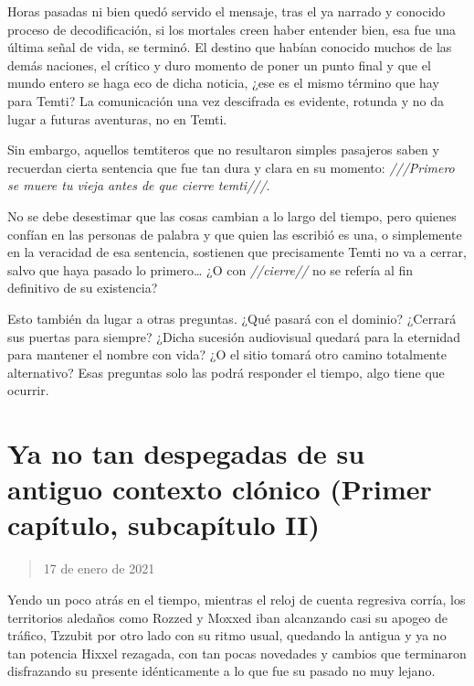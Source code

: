 \documentclass[
  spanish,
]{book}
\begin{document}
Horas pasadas ni bien quedó servido el mensaje, tras el ya narrado y conocido proceso de decodificación, si los mortales creen haber entender bien, esa fue una última señal de vida, se terminó. El destino que habían conocido muchos de las demás naciones, el crítico y duro momento de poner un punto final y que el mundo entero se haga eco de dicha noticia, ¿ese es el mismo término que hay para Temti? La comunicación una vez descifrada es evidente, rotunda y no da lugar a futuras aventuras, no en Temti.

Sin embargo, aquellos temtiteros que no resultaron simples pasajeros saben y recuerdan cierta sentencia que fue tan dura y clara en su momento: \emph{///Primero se muere tu vieja antes de que cierre temti///}.

No se debe desestimar que las cosas cambian a lo largo del tiempo, pero quienes confían en las personas de palabra y que quien las escribió es una, o simplemente en la veracidad de esa sentencia, sostienen que precisamente Temti no va a cerrar, salvo que haya pasado lo primero\ldots{} ¿O con \emph{//cierre//} no se refería al fin definitivo de su existencia?

Esto también da lugar a otras preguntas. ¿Qué pasará con el dominio? ¿Cerrará sus puertas para siempre? ¿Dicha sucesión audiovisual quedará para la eternidad para mantener el nombre con vida? ¿O el sitio tomará otro camino totalmente alternativo?
Esas preguntas solo las podrá responder el tiempo, algo tiene que ocurrir.

\hypertarget{ya-no-tan-despegadas-de-su-antiguo-contexto-cluxf3nico-primer-capuxedtulo-subcapuxedtulo-ii}{%
\section{Ya no tan despegadas de su antiguo contexto clónico (Primer capítulo, subcapítulo II)}\label{ya-no-tan-despegadas-de-su-antiguo-contexto-cluxf3nico-primer-capuxedtulo-subcapuxedtulo-ii}}

\begin{quote}
17 de enero de 2021
\end{quote}

Yendo un poco atrás en el tiempo, mientras el reloj de cuenta regresiva corría, los territorios aledaños como Rozzed y Moxxed iban alcanzando casi su apogeo de tráfico, Tzzubit por otro lado con su ritmo usual, quedando la antigua y ya no tan potencia Hixxel rezagada, con tan pocas novedades y cambios que terminaron disfrazando su presente idénticamente a lo que fue su pasado no muy lejano.
\end{document}
